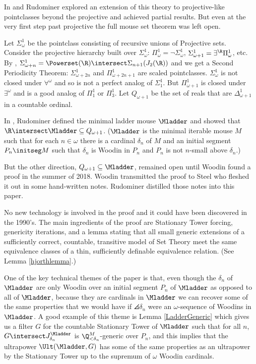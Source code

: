 \documentclass[oneside,12pt]{amsart}
\begin{document}
In \cite{My_Thesis} and \cite{Mouse_Sets} Rudominer explored an extension of this theory
to projective-like pointclasses beyond the projective and achieved partial results.
But even at the very first step past projective the full mouse set theorem was left open.

Let $\Sigma^1_{\omega}$
be the pointclass consisting of recursive unions of Projective sets. Consider
the projective hierarchy built over $\Sigma^1_{\omega}$:
$\Pi^1_{\omega} = \neg \Sigma^1_{\omega}$,
$\Sigma^1_{\omega+1} = \exists^{\R} \Pi^1_{\omega}$, etc.
By \cite{Scales_In_LofR}, $\Sigma^1_{\omega+n} = \Powerset(\R)\intersect \Sigma_{n+1}(J_2(\R))$
and we get a Second Periodicity Theorem: $\Sigma^1_{\omega+2n}$ and $\Pi^1_{\omega+2n+1}$ are scaled pointclasses.
$\Sigma^1_{\omega}$ is not closed under $\forall^{\omega}$ and so is not a perfect analog of $\Sigma^1_1$.
But $\Pi^1_{\omega+1}$ is closed under $\exists^{\omega}$ and is a good analog of $\Pi^1_1$ or $\Pi^1_3$.
Let $Q_{\omega+1}$ be the set of reals that are $\Delta^1_{\omega+1}$ in a countable ordinal.

In \cite{My_Thesis}, Rudominer defined the minimal ladder mouse $\Mladder$ and showed that
$\R\intersect\Mladder\subseteq Q_{\omega+1}$. ($\Mladder$ is the minimal iterable mouse $M$ such
that for each $n\in\omega$ there is a cardinal $\delta_n$ of $M$ and an initial segment $P_n \initseg M$
such that $\delta_n$ is Woodin in $P_n$ and $P_n$ is not $n$-small above $\delta_n$.)

But the other direction, $Q_{\omega+1} \subseteq \Mladder$, remained open until
Woodin found a proof in the summer of 2018. Woodin transmitted the proof to Steel who fleshed it out
in some hand-written notes. Rudominer distilled those notes into this paper.

No new technology is involved in the proof and it could have been discovered in the 1990's. The main ingredients
of the proof are Stationary Tower forcing, genericity iterations, and a lemma stating that
all small generic extensions of a sufficiently correct, countable, transitive model of Set Theory
meet the same equivalence classes of a thin, sufficiently
definable equivalence
relation. (See Lemma \ref{hjorthlemma}.)

One of the key technical themes of the paper is that, even though
the $\delta_n$ of $\Mladder$ are only Woodin over an initial segment $P_n$
of $\Mladder$ as opposed to all of $\Mladder$, because they are
cardinals in $\Mladder$ we can recover some of the same properties
that we would have if $\angles{\delta_n}$ were an $\omega$-sequence
of Woodins in $\Mladder$. A good example of this theme is Lemma
\ref{LadderGeneric} which gives us a filter $G$ for the countable
Stationary Tower of $\Mladder$ such that for all $n$,
$G\intersect J^{\Mladder}_{\delta_n}$ is $\Q_{<\delta_n}^M$-generic over $P_n$, and this implies
that the ultrapower $\Ult(\Mladder, G)$ has some of the same properties as an
ultrapower by the Stationary Tower up to the supremum
of $\omega$ Woodin cardinals.
\end{document}
